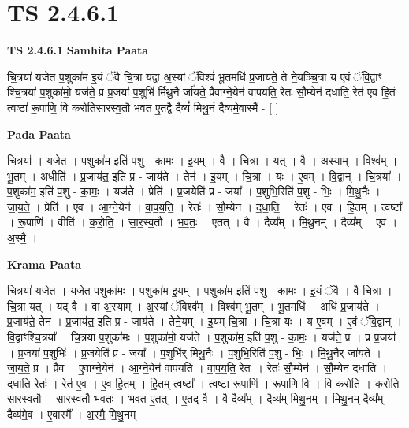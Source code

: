 \documentclass[17pt]{extarticle}
\begin{document}
\section{ TS 2.4.6.1 }

\textbf{TS 2.4.6.1 } \newline
\textbf{Samhita Paata} \newline

चि॒त्रया॑ यजेत प॒शुका॑म इ॒यं ॅवै चि॒त्रा यद्वा अ॒स्यां ॅविश्वं॑ भू॒तमधि॑ प्र॒जाय॑ते॒ ते ने॒यञ्चि॒त्रा य ए॒वं ॅवि॒द्वाꣳ श्चि॒त्रया॑ प॒शुका॑मो॒ यज॑ते॒ प्र प्र॒जया॑ प॒शुभि॑ र्मिथु॒नै र्जा॑यते॒ प्रैवाग्ने॒येन॑ वापयति॒ रेतः॑ सौ॒म्येन॑ दधाति॒ रेत॑ ए॒व हि॒तं त्वष्टा॑ रू॒पाणि॒ वि क॑रोतिसारस्व॒तौ भ॑वत ए॒तद्वै दैव्यं॑ मिथु॒नं दैव्य॑मे॒वास्मै॑ - [  ] \newline

\textbf{Pada Paata} \newline

चि॒त्रया᳚ । य॒जे॒त॒ । प॒शुका॑म॒ इति॑ प॒शु - का॒मः॒ । इ॒यम् । वै । चि॒त्रा । यत् । वै । अ॒स्याम् । विश्व᳚म् । भू॒तम् । अधीति॑ । प्र॒जाय॑त॒ इति॑ प्र - जाय॑ते । तेन॑ । इ॒यम् । चि॒त्रा । यः । ए॒वम् । वि॒द्वान् । चि॒त्रया᳚ । प॒शुका॑म॒ इति॑ प॒शु - का॒मः॒ । यज॑ते । प्रेति॑ । प्र॒जयेति॑ प्र - जया᳚ । प॒शुभि॒रिति॑ प॒शु - भिः॒ । मि॒थु॒नैः । जा॒य॒ते॒ । प्रेति॑ । ए॒व । आ॒ग्ने॒येन॑ । वा॒प॒य॒ति॒ । रेतः॑ । सौ॒म्येन॑ । द॒धा॒ति॒ । रेतः॑ । ए॒व । हि॒तम् । त्वष्टा᳚ । रू॒पाणि॑ । वीति॑ । क॒रो॒ति॒ । सा॒र॒स्व॒तौ । भ॒व॒तः॒ । ए॒तत् । वै । दैव्य᳚म् । मि॒थु॒नम् । दैव्य᳚म् । ए॒व । अ॒स्मै॒ ।  \newline


\textbf{Krama Paata} \newline

चि॒त्रया॑ यजेत । य॒जे॒त॒ प॒शुका॑मः । प॒शुका॑म इ॒यम् । प॒शुका॑म॒ इति॑ प॒शु - का॒मः॒ । इ॒यं ॅवै । वै चि॒त्रा । चि॒त्रा यत् । यद् वै । वा अ॒स्याम् । अ॒स्यां ॅविश्व᳚म् । विश्व॑म् भू॒तम् । भू॒तमधि॑ । अधि॑ प्र॒जाय॑ते । प्र॒जाय॑ते॒ तेन॑ । प्र॒जाय॑त॒ इति॑ प्र - जाय॑ते । तेने॒यम् । इ॒यम् चि॒त्रा । चि॒त्रा यः । य ए॒वम् । ए॒वं ॅवि॒द्वान् । वि॒द्वाꣳश्चि॒त्रया᳚ । चि॒त्रया॑ प॒शुका॑मः । प॒शुका॑मो॒ यज॑ते । प॒शुका॑म॒ इति॑ प॒शु - का॒मः॒ । यज॑ते॒ प्र । प्र प्र॒जया᳚ । प्र॒जया॑ प॒शुभिः॑ । 
प्र॒जयेति॑ प्र - जया᳚ । प॒शुभि॑र् मिथु॒नैः । प॒शुभि॒रिति॑ प॒शु - भिः॒ । मि॒थु॒नैर् जा॑यते । जा॒य॒ते॒ प्र । प्रैव । ए॒वाग्ने॒येन॑ । आ॒ग्ने॒येन॑ वापयति । वा॒प॒य॒ति॒ रेतः॑ । रेतः॑ सौ॒म्येन॑ । सौ॒म्येन॑ दधाति । द॒धा॒ति॒ रेतः॑ । रेत॑ ए॒व । ए॒व हि॒तम् । हि॒तम् त्वष्टा᳚ । त्वष्टा॑ रू॒पाणि॑ । रू॒पाणि॒ वि । वि क॑रोति । क॒रो॒ति॒ सा॒र॒स्व॒तौ । सा॒र॒स्व॒तौ भ॑वतः । भ॒व॒त॒ ए॒तत् । ए॒तद् वै । वै दैव्य᳚म् । दैव्य॑म् मिथु॒नम् । मि॒थु॒नम् दैव्य᳚म् । दैव्य॑मे॒व । ए॒वास्मै᳚ । अ॒स्मै॒ मि॒थु॒नम् \newline
\end{document}

